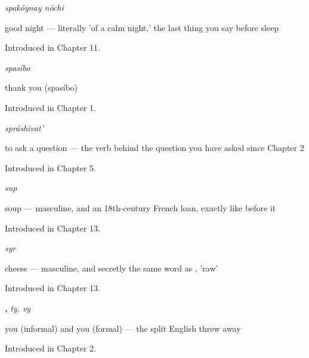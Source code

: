 \noindent\begin{minipage}[t]{\linewidth}
\raggedright
\textbf{ }\enspace\emph{spakóynay nóchi}\par
\small good night — literally 'of a calm night,' the last thing you say before sleep\par
\footnotesize Introduced in Chapter 11.
\end{minipage}\par\medskip

\noindent\begin{minipage}[t]{\linewidth}
\raggedright
\textbf{}\enspace\emph{spasíbo}\par
\small thank you (spasíbo)\par
\footnotesize Introduced in Chapter 1.
\end{minipage}\par\medskip

\noindent\begin{minipage}[t]{\linewidth}
\raggedright
\textbf{}\enspace\emph{spráshivat'}\par
\small to ask a question — the verb behind the question you have asked since Chapter 2\par
\footnotesize Introduced in Chapter 5.
\end{minipage}\par\medskip

\noindent\begin{minipage}[t]{\linewidth}
\raggedright
\textbf{}\enspace\emph{sup}\par
\small soup — masculine, and an 18th-century French loan, exactly like  before it\par
\footnotesize Introduced in Chapter 13.
\end{minipage}\par\medskip

\noindent\begin{minipage}[t]{\linewidth}
\raggedright
\textbf{}\enspace\emph{syr}\par
\small cheese — masculine, and secretly the same word as , 'raw'\par
\footnotesize Introduced in Chapter 13.
\end{minipage}\par\medskip

\noindent\begin{minipage}[t]{\linewidth}
\raggedright
\textbf{, }\enspace\emph{ty, vy}\par
\small you (informal) and you (formal) — the split English threw away\par
\footnotesize Introduced in Chapter 2.
\end{minipage}\par\medskip

